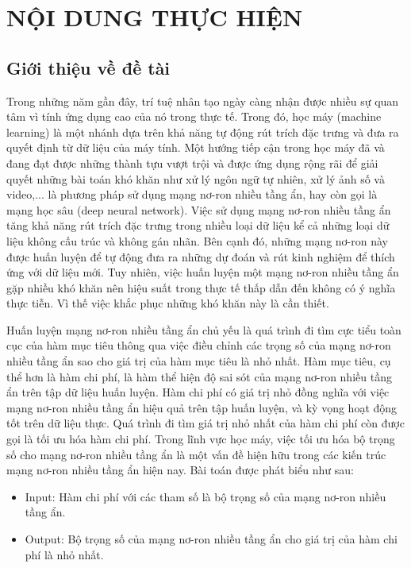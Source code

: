 \documentclass{article}[14pt]
\begin{document}
    \section{NỘI DUNG THỰC HIỆN}
    {

    
    \subsection{Giới thiệu về đề tài}
    Trong những năm gần đây, trí tuệ nhân tạo ngày càng nhận được nhiều sự quan tâm vì tính ứng dụng cao của nó trong thực tế. Trong đó, học máy (machine learning) là một nhánh dựa trên khả năng tự động rút trích đặc trưng và đưa ra quyết định từ dữ liệu của máy tính. Một hướng tiếp cận trong học máy đã và đang đạt được những thành tựu vượt trội và được ứng dụng rộng rãi để giải quyết những bài toán khó khăn như xử lý ngôn ngữ tự nhiên, xử lý ảnh số và video,... là phương pháp sử dụng mạng nơ-ron nhiều tầng ẩn, hay còn gọi là mạng học sâu (deep neural network). Việc sử dụng mạng nơ-ron nhiều tầng ẩn tăng khả năng rút trích đặc trưng trong nhiều loại dữ liệu kể cả những loại dữ liệu không cấu trúc và không gán nhãn. Bên cạnh đó, những mạng nơ-ron này được huấn luyện để tự động đưa ra những dự đoán và rút kinh nghiệm để thích ứng với dữ liệu mới. Tuy nhiên, việc huấn luyện một mạng nơ-ron nhiều tầng ẩn gặp nhiều khó khăn nên hiệu suất trong thực tế thấp dẫn đến không có ý nghĩa thực tiễn. Vì thế việc khắc phục những khó khăn này là cần thiết. \par
    
    Huấn luyện mạng nơ-ron nhiều tầng ẩn chủ yếu là quá trình đi tìm cực tiểu toàn cục của hàm mục tiêu thông qua việc điều chỉnh các trọng số của mạng nơ-ron nhiều tầng ẩn sao cho giá trị của hàm mục tiêu là nhỏ nhất. Hàm mục tiêu, cụ thể hơn là hàm chi phí, là hàm thể hiện độ sai sót của mạng nơ-ron nhiều tầng ẩn trên tập dữ liệu huấn luyện. Hàm chi phí có giá trị nhỏ đồng nghĩa với việc mạng nơ-ron nhiều tầng ẩn hiệu quả trên tập huấn luyện, và kỳ vọng hoạt động tốt trên dữ liệu thực. Quá trình đi tìm giá trị nhỏ nhất của hàm chi phí còn được gọi là tối ưu hóa hàm chi phí. Trong lĩnh vực học máy, việc tối ưu hóa bộ trọng số cho mạng nơ-ron nhiều tầng ẩn là một vấn đề hiện hữu trong các kiến trúc mạng nơ-ron nhiều tầng ẩn hiện nay. Bài toán được phát biểu như sau: \par
   \begin{itemize}
      \item Input: Hàm chi phí với các tham số là bộ trọng số của mạng nơ-ron nhiều tầng ẩn.
      \item Output: Bộ trọng số của mạng nơ-ron nhiều tầng ẩn cho giá trị của hàm chi phí là nhỏ nhất.
    \end{itemize}
    
}
\end{document}
